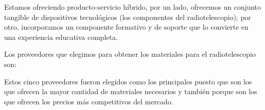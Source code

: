 Estamos ofreciendo producto-servicio híbrido, por un lado, ofrecemos
un conjunto tangible de dispositivos tecnológicos (los componentes del
radiotelescopio); por otro, incorporamos un componente formativo y de
soporte que lo convierte en una experiencia educativa completa.

Los proveedores que elegimos para obtener los materiales para el 
radiotelescopio son: 


Estos cinco proveedores fueron elegidos como los principales puesto que
son los que ofrecen la mayor cantidad de materiales necesarios y también 
porque son los que ofrecen los precios más competitivos del mercado.

